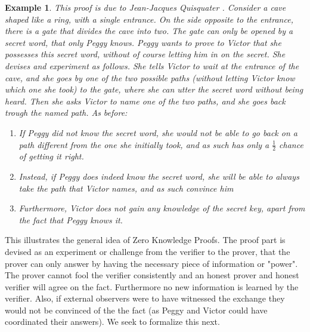 \documentclass{article}
\newtheorem{example}{Example}
\begin{document}
\begin{example}
This proof is due to Jean-Jacques Quisquater \cite{quisquaterHowExplainZeroknowledge1989}.
Consider a cave shaped like a ring, with a single entrance. On the side opposite to the entrance, there is a gate that divides the cave into two. The gate can only be opened by a secret word, that only Peggy knows. Peggy wants to prove to Victor that she possesses this secret word, without of course letting him in on the secret. She devises and experiment as follows. She tells Victor to wait at the entrance of the cave, and she goes by one of the two possible paths (without letting Victor know which one she took) to the gate, where she can utter the secret word without being heard. Then she asks Victor to name one of the two paths, and she goes back trough the named path. 
As before:
\begin{enumerate}
    \item If Peggy did not know the secret word, she would not be able to go back on a path different from the one she initially took, and as such has only a $\frac{1}{2}$ chance of getting it right.
    \item Instead, if Peggy does indeed know the secret word, she will be able to always take the path that Victor names, and as such convince him
    \item Furthermore, Victor does not gain any knowledge of the secret key, apart from the fact that Peggy knows it. 
\end{enumerate}
\end{example}

This illustrates the general idea of Zero Knowledge Proofs. The proof part is devised as an experiment or challenge from the verifier to the prover, that the prover can only answer by having the necessary piece of information or "power". The prover cannot fool the verifier consistently and an honest prover and honest verifier will agree on the fact. Furthermore no new information is learned by the verifier. Also, if external observers were to have witnessed the exchange they would not be convinced of the the fact (as Peggy and Victor could have coordinated their answers). 
We seek to formalize this next. 
\end{document}
